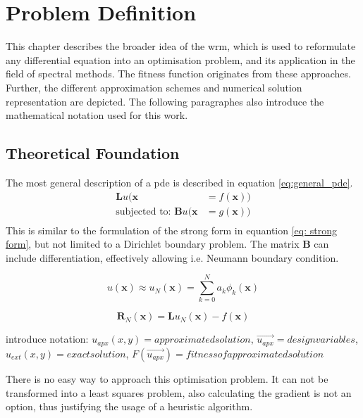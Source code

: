 \documentclass[./\jobname.tex]{subfiles}
\begin{document}
\chapter{Problem Definition}
This chapter describes the broader idea of the \gls{wrm}, which is used to reformulate any differential equation into an optimisation problem, and its application in the field of spectral methods. The fitness function originates from these approaches. Further, the different approximation schemes and numerical solution representation are depicted. The following paragraphes also introduce the mathematical notation used for this work. 

\section{Theoretical Foundation}
\label{chap:opt_problem}

The most general description of a \gls{pde} is described in equation \ref{eq:general_pde}.
\begin{equation}
\label{eq:general_pde}
\begin{split}
\mathbf{L}u(\mathbf{x} & = f(\mathbf{x})) \\
\text{subjected to: }\mathbf{B}u(\mathbf{x} & = g(\mathbf{x})) \\
\end{split}
\end{equation}
This is similar to the formulation of the strong form in equantion \ref{eq: strong form}, but not limited to a Dirichlet boundary problem. The matrix $\mathbf{B}$ can include differentiation, effectively allowing i.e. Neumann boundary condition. 

\begin{equation}
u(\mathbf{x}) \approx u_{N}(\mathbf{x}) = \sum_{k=0}^{N} a_k \phi_k (\mathbf{x})
\end{equation}

\begin{equation}
\mathbf{R}_N(\mathbf{x}) = \mathbf{L}u_N(\mathbf{x}) - f(\mathbf{x})
\end{equation}

introduce notation: $u_{apx}(x,y) = approximated solution$, $\vec{u_{apx}} = design variables$, $u_{ext}(x,y) = exact solution$, $F(\vec{u_{apx}}) = fitness of approximated solution$

There is no easy way to approach this optimisation problem. It can not be transformed into a least squares problem, also calculating the gradient is not an option, thus justifying the usage of a heuristic algorithm.  
\end{document}
